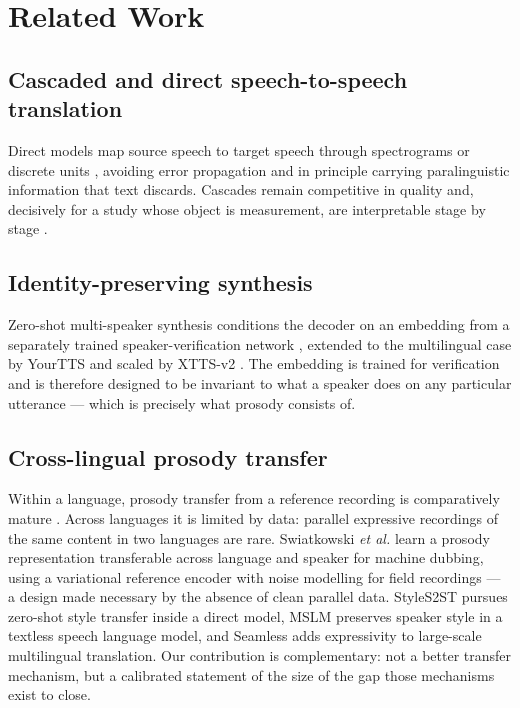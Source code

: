 \documentclass[journal]{IEEEtran}
\begin{document}
\section{Related Work}

\subsection{Cascaded and direct speech-to-speech translation}
Direct models map source speech to target speech through spectrograms
\cite{jia2022translatotron2} or discrete units \cite{lee2022discreteunits,inaguma2023unity},
avoiding error propagation and in principle carrying paralinguistic information that text discards.
Cascades remain competitive in quality \cite{bentivogli2021cascade} and, decisively for a study
whose object is measurement, are interpretable stage by stage \cite{sperber2020endtoend}.

\subsection{Identity-preserving synthesis}
Zero-shot multi-speaker synthesis conditions the decoder on an embedding from a separately trained
speaker-verification network \cite{jia2018sv2tts}, extended to the multilingual case by YourTTS
\cite{casanova2022yourtts} and scaled by XTTS-v2 \cite{casanova2024xtts}. The embedding is trained
for verification and is therefore designed to be invariant to what a speaker does on any particular
utterance --- which is precisely what prosody consists of.

\subsection{Cross-lingual prosody transfer}
Within a language, prosody transfer from a reference recording is comparatively mature
\cite{skerryryan2018prosody,wang2018gst}. Across languages it is limited by data: parallel
expressive recordings of the same content in two languages are rare.
Swiatkowski \emph{et al.} \cite{swiatkowski2023dubbing} learn a prosody representation transferable
across language and speaker for machine dubbing, using a variational reference encoder with noise
modelling for field recordings --- a design made necessary by the absence of clean parallel data.
StyleS2ST \cite{song2023styles2st} pursues zero-shot style transfer inside a direct model, MSLM
\cite{peng2024mslm} preserves speaker style in a textless speech language model, and Seamless
\cite{seamless2023} adds expressivity to large-scale multilingual translation. Our contribution is
complementary: not a better transfer mechanism, but a calibrated statement of the size of the gap
those mechanisms exist to close.
\end{document}
